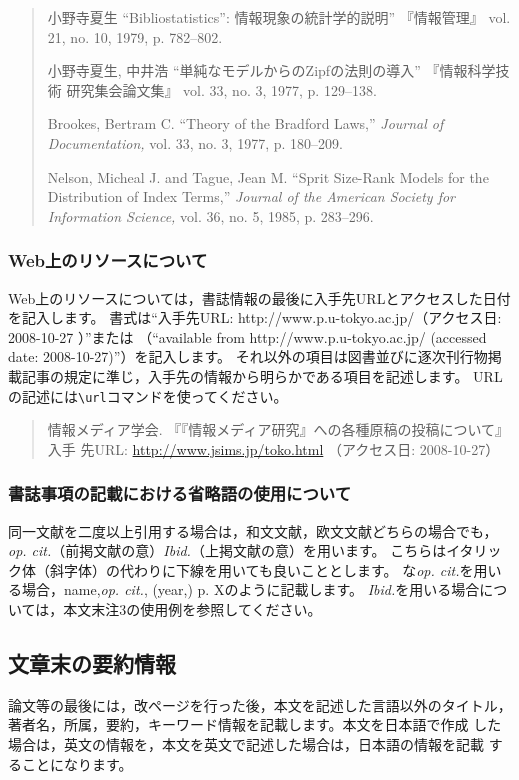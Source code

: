 \documentclass[b5paper,10pt,twocolumn,tombow]{jarticle}
\begin{document}
\begin{quote}
小野寺夏生 ``Bibliostatistics'': 情報現象の統計学的説明'' 『情報管理』
 vol. 21, no. 10, 1979, p. 782--802.

小野寺夏生, 中井浩 ``単純なモデルからのZipfの法則の導入'' 『情報科学技術
 研究集会論文集』 vol. 33, no. 3, 1977, p. 129--138.

Brookes, Bertram C. ``Theory of the Bradford Laws,'' \textit{Journal of
 Documentation,} vol. 33, no. 3, 1977, p. 180--209.

Nelson, Micheal J. and Tague, Jean M. ``Sprit Size-Rank Models for the
 Distribution of Index Terms,'' \textit{Journal of the American Society
 for Information Science,} vol. 36, no. 5, 1985, p. 283--296.
\end{quote}

\subsubsection{Web上のリソースについて}
Web上のリソースについては，書誌情報の最後に入手先URLとアクセスした日付を記入します。
書式は``入手先URL: http://www.p.u-tokyo.ac.jp/（アクセス日: 2008-10-27 ）''または
（``available from http://www.p.u-tokyo.ac.jp/ (accessed date: 2008-10-27)''）を記入します。
それ以外の項目は図書並びに逐次刊行物掲載記事の規定に準じ，入手先の情報から明らかである項目を記述します。
URLの記述には\verb|\url|コマンドを使ってください。

\begin{quote}
  情報メディア学会. 『『情報メディア研究』への各種原稿の投稿について』 入手
  先URL: \url{http://www.jsims.jp/toko.html} （アクセス日: 2008-10-27）
\end{quote}

\subsubsection{書誌事項の記載における省略語の使用について}

同一文献を二度以上引用する場合は，和文文献，欧文文献どちらの場合でも，
\textit{op. cit.}（前掲文献の意）\textit{Ibid.}（上掲文献の意）を用います。
こちらはイタリック体（斜字体）の代わりに下線を用いても良いこととします。
な\textit{op. cit.}を用いる場合，name,\textit{op. cit.}, (year,) p. Xのように記載します。
\textit{Ibid.}を用いる場合については，本文末注3の使用例を参照してください。


\subsection{文章末の要約情報}
論文等の最後には，改ページを行った後，本文を記述した言語以外のタイトル，
著者名，所属，要約，キーワード情報を記載します。本文を日本語で作成
した場合は，英文の情報を，本文を英文で記述した場合は，日本語の情報を記載
することになります。
\end{document}
